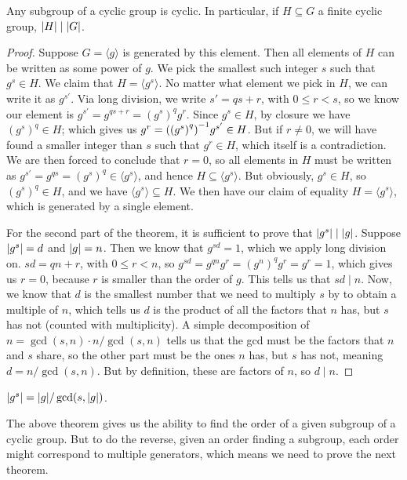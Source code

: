 \begin{theorem}\label{thm:cyclic-subgroup}
    Any subgroup of a cyclic group is cyclic.
    In particular, if \(H \subseteq G\) a finite cyclic group,
    \(\abs{H} \mid \abs{G}\).
\end{theorem}
\begin{proof}
    Suppose \(G = \langle g \rangle\) is generated by this element.
    Then all elements of \(H\) can be written as some power of \(g\).
    We pick the smallest such integer \(s\) such that \(g^s \in H\).
    We claim that \(H = \langle g^s \rangle\).
    No matter what element we pick in \(H\),
    we can write it as \(g^{s'}\).
    Via long division, we write \(s' = qs + r\), with \(0 \leq r < s\),
    so we know our element is
    \(g^{s'} = g^{qs+r} = {(g^s)}^q g^r\).
    Since \(g^s \in H\), by closure we have \({(g^s)}^q \in H\);
    which gives us \(g^r = {\qty({(g^s)}^q)}^{-1} g^{s'} \in H\).
    But if \(r \neq 0\),
    we will have found a smaller integer than \(s\)
    such that \(g^r \in H\),
    which itself is a contradiction.
    We are then forced to conclude that \(r = 0\),
    so all elements in \(H\) must be written as
    \(g^{s'} = g^{qs} = {(g^s)}^q \in \langle g^s \rangle\),
    and hence \(H \subseteq \langle g^s \rangle\).
    But obviously, \(g^s \in H\), so \({(g^s)}^q \in H\),
    and we have \(\langle g^s \rangle \subseteq H\).
    We then have our claim of equality \(H = \langle g^s \rangle\),
    which is generated by a single element.

    For the second part of the theorem,
    it is sufficient to prove that \(\abs{g^s} \mid \abs{g}\).
    Suppose \(\abs{g^s} = d\) and \(\abs{g} = n\).
    Then we know that \(g^{sd} = 1\), which we apply long division on.
    \(sd = qn + r\), with \(0 \leq r < n\),
    so \(g^{sd} = g^{qn}g^r = {(g^n)}^q g^r = g^r = 1\),
    which gives us \(r = 0\),
    because \(r\) is smaller than the order of \(g\).
    This tells us that \(sd \mid n\).
    Now, we know that \(d\) is the smallest number
    that we need to multiply \(s\) by to obtain a multiple of \(n\),
    which tells us \(d\) is the product of
    all the factors that \(n\) has,
    but \(s\) has not (counted with multiplicity).
    A simple decomposition of \(n = \gcd(s,n) \cdot n/\gcd(s,n)\)
    tells us that the gcd must be the factors that \(n\) and \(s\) share,
    so the other part must be the ones \(n\) has, but \(s\) has not,
    meaning \(d = n/\gcd(s,n)\).
    But by definition, these are factors of \(n\),
    so \(d \mid n\).
\end{proof}
\begin{corollary}\label{cor:order-cyclic-group}
    \(\abs{g^s} = \abs{g}/\gcd(s,\abs{g})\).
\end{corollary}
\begin{remark}
    The above theorem gives us the ability to
    find the order of a given subgroup of a cyclic group.
    But to do the reverse, given an order finding a subgroup,
    each order might correspond to multiple generators,
    which means we need to prove the next theorem.
\end{remark}

